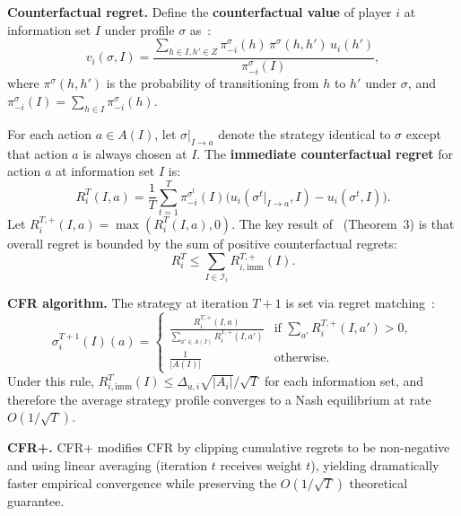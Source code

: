 \documentclass[sigconf]{aamas}
\begin{document}
\textbf{Counterfactual regret.}\quad
Define the \textbf{counterfactual value} of player $i$ at information set $I$ under profile $\sigma$ as~\cite{Zinkevich2007}:
\begin{equation}
    v_i(\sigma, I) = \frac{\sum_{h \in I, h' \in Z} \pi_{-i}^{\sigma}(h) \, \pi^{\sigma}(h, h') \, u_i(h')}{\pi_{-i}^{\sigma}(I)},
    \label{eq:cfv}
\end{equation}
where $\pi^{\sigma}(h, h')$ is the probability of transitioning from $h$ to $h'$ under $\sigma$, and $\pi_{-i}^{\sigma}(I) = \sum_{h \in I} \pi_{-i}^{\sigma}(h)$.

For each action $a \in A(I)$, let $\sigma|_{I \to a}$ denote the strategy identical to $\sigma$ except that action $a$ is always chosen at $I$. The \textbf{immediate counterfactual regret} for action $a$ at information set $I$ is:
\begin{equation}
    R_{i}^{T}(I, a) = \frac{1}{T} \sum_{t=1}^{T} \pi_{-i}^{\sigma^t}(I) \Big( u_i(\sigma^t|_{I \to a}, I) - u_i(\sigma^t, I) \Big).
    \label{eq:cfr_action}
\end{equation}
Let $R_{i}^{T,+}(I, a) = \max(R_i^T(I, a), 0)$. The key result of~\cite{Zinkevich2007} (Theorem~3) is that overall regret is bounded by the sum of positive counterfactual regrets:
\begin{equation}
    R_i^T \leq \sum_{I \in \mathcal{I}_i} R_{i,\mathrm{imm}}^{T,+}(I).
    \label{eq:cfr_bound}
\end{equation}

\textbf{CFR algorithm.}\quad
The strategy at iteration $T+1$ is set via regret matching~\cite{Zinkevich2007}:
\begin{equation}
    \sigma_i^{T+1}(I)(a) = \begin{cases}
        \displaystyle\frac{R_i^{T,+}(I, a)}{\sum_{a' \in A(I)} R_i^{T,+}(I, a')} & \text{if } \sum_{a'} R_i^{T,+}(I, a') > 0, \\[8pt]
        \displaystyle\frac{1}{|A(I)|} & \text{otherwise.}
    \end{cases}
    \label{eq:regret_matching}
\end{equation}
Under this rule, $R_{i,\mathrm{imm}}^{T}(I) \leq \Delta_{u,i} \sqrt{|A_i|} / \sqrt{T}$ for each information set, and therefore the average strategy profile converges to a Nash equilibrium at rate $O(1/\sqrt{T})$.

\textbf{CFR+.}\quad
CFR+ \cite{Tammelin2015} modifies CFR by clipping cumulative regrets to be non-negative and using linear averaging (iteration $t$ receives weight $t$), yielding dramatically faster empirical convergence while preserving the $O(1/\sqrt{T})$ theoretical guarantee.
\end{document}
